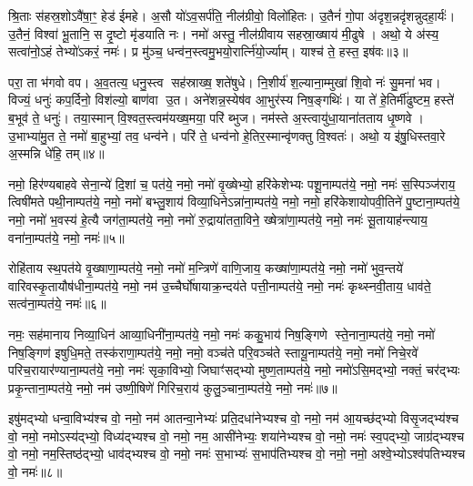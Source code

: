 श्रि॒ताः स॑हस्र॒शोऽवै॑षा॒ꣳ॒ हेड॑ ईमहे। अ॒सौ यो॑ऽव॒सर्प॑ति॒ नील॑ग्रीवो॒ विलो॑हितः। उ॒तैनं॑ गो॒पा अ॑दृश॒न्नदृ॑शन्नुदहा॒र्यः॑। उ॒तैनं॒ विश्वा॑ भू॒तानि॒ स दृ॒ष्टो मृ॑डयाति नः। नमो॑ अस्तु॒ नील॑ग्रीवाय सहस्रा॒ख्षाय॑ मी॒ढुषे। अथो॒ ये अ॑स्य॒ सत्वा॑नो॒ऽहं तेभ्यो॑ऽकरं॒ नमः॑। प्र मु॑ञ्च॒ धन्व॑न॒स्त्वमु॒भयो॒रार्त्नि॑यो॒र्ज्याम्। याश्च॑ ते॒ हस्त॒ इष॑वः॥३॥

परा॒ ता भ॑गवो वप। अ॒व॒तत्य॒ धनु॒स्त्व सह॑स्राख्ष॒ शते॑षुधे। नि॒शीर्य॑ श॒ल्याना॒म्मुखा॑ शि॒वो नः॑ सु॒मना॑ भव। विज्यं॒ धनुः॑ कप॒र्दिनो॒ विश॑ल्यो॒ बाण॑वा उ॒त। अने॑शन्न॒स्येष॑व आ॒भुर॑स्य निष॒ङ्गथिः॑। या ते॑ हे॒तिर्मी॑ढुष्टम॒ हस्ते॑ ब॒भूव॑ ते॒ धनुः॑। तया॒स्मान् वि॒श्वत॒स्त्वम॑यख्ष॒मया॒ परि॑ ब्भुज। नम॑स्ते अ॒स्त्वायु॑धा॒याना॑तताय धृ॒ष्णवे। उ॒भाभ्या॑मु॒त ते॒ नमो॑ बा॒हुभ्यां॒ तव॒ धन्व॑ने। परि॑ ते॒ धन्व॑नो हे॒तिर॒स्मान्वृ॑णक्तु वि॒श्वतः॑। अथो॒ य इ॑षु॒धिस्तवा॒रे अ॒स्मन्नि धे॑हि॒ तम्॥४॥

{\anuvakamend[{हस्ते॑ दि॒क्ष्विष॑व उ॒भाभ्यां॒ द्वाविꣳ॑शतिश्च॥१॥}]}

नमो॒ हिर॑ण्यबाहवे सेना॒न्ये॑ दि॒शां च॒ पत॑ये॒ नमो॒ नमो॑ वृ॒ख्षेभ्यो॒ हरि॑केशेभ्यः पशू॒नाम्पत॑ये॒ नमो॒ नमः॑ स॒स्पिञ्ज॑राय॒ त्विषी॑मते पथी॒नाम्पत॑ये॒ नमो॒ नमो॑ बभ्लु॒शाय॑ विव्या॒धिनेऽन्ना॑ना॒म्पत॑ये॒ नमो॒ नमो॒ हरि॑केशायोपवी॒तिने॑ पु॒ष्टाना॒म्पत॑ये॒ नमो॒ नमो॑ भ॒वस्य॑ हे॒त्यै जग॑ता॒म्पत॑ये॒ नमो॒ नमो॑ रु॒द्राया॑तता॒विने॒ ख्षेत्रा॑णा॒म्पत॑ये॒ नमो॒ नमः॑ सू॒तायाह॑न्त्याय॒ वना॑ना॒म्पत॑ये॒ नमो॒ नमः॑॥५॥

रोहि॑ताय स्थ॒पत॑ये वृ॒ख्षाणा॒म्पत॑ये॒ नमो॒ नमो॑ म॒न्त्रिणे॑ वाणि॒जाय॒ कख्षा॑णा॒म्पत॑ये॒ नमो॒ नमो॑ भुव॒न्तये॑ वारिवस्कृ॒तायौष॑धीना॒म्पत॑ये॒ नमो॒ नम॑ उ॒च्चैर्घो॑षायाक्र॒न्दय॑ते पत्ती॒नाम्पत॑ये॒ नमो॒ नमः॑ कृथ्स्नवी॒ताय॒ धाव॑ते॒ सत्व॑ना॒म्पत॑ये॒ नमः॑॥६॥

{\anuvakamend[{वना॑ना॒म्पत॑ये॒ नमो॒ नम॒ एका॒न्नत्रि॒ꣳ॒शच्च॑॥२॥}]}

नमः॒ सह॑मानाय निव्या॒धिन॑ आव्या॒धिनी॑ना॒म्पत॑ये॒ नमो॒ नमः॑ ककु॒भाय॑ निष॒ङ्गिणे स्ते॒नाना॒म्पत॑ये॒ नमो॒ नमो॑ निष॒ङ्गिण॑ इषुधि॒मते॒ तस्क॑राणा॒म्पत॑ये॒ नमो॒ नमो॒ वञ्च॑ते परि॒वञ्च॑ते स्तायू॒नाम्पत॑ये॒ नमो॒ नमो॑ निचे॒रवे॑ परिच॒रायार॑ण्याना॒म्पत॑ये॒ नमो॒ नमः॑ सृका॒विभ्यो॒ जिघाꣳ॑सद्भ्यो मुष्ण॒ताम्पत॑ये॒ नमो॒ नमो॑ऽसि॒मद्भ्यो॒ नक्तं॒ चर॑द्भ्यः प्रकृ॒न्ताना॒म्पत॑ये॒ नमो॒ नम॑ उष्णी॒षिणे॑ गिरिच॒राय॑ कुलु॒ञ्चाना॒म्पत॑ये॒ नमो॒ नमः॑॥७॥

इषु॑मद्भ्यो धन्वा॒विभ्य॑श्च वो॒ नमो॒ नम॑ आतन्वा॒नेभ्यः॑ प्रति॒दधा॑नेभ्यश्च वो॒ नमो॒ नम॑ आ॒यच्छ॑द्भ्यो विसृ॒जद्भ्य॑श्च वो॒ नमो॒ नमोऽस्य॑द्भ्यो॒ विध्य॑द्भ्यश्च वो॒ नमो॒ नम॒ आसी॑नेभ्यः॒ शया॑नेभ्यश्च वो॒ नमो॒ नमः॑ स्व॒पद्भ्यो॒ जाग्र॑द्भ्यश्च वो॒ नमो॒ नम॒स्तिष्ठ॑द्भ्यो॒ धाव॑द्भ्यश्च वो॒ नमो॒ नमः॑ स॒भाभ्यः॑ स॒भाप॑तिभ्यश्च वो॒ नमो॒ नमो॒ अश्वे॒भ्योऽश्व॑पतिभ्यश्च वो॒ नमः॑॥८॥

